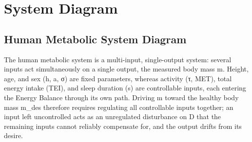 
\section{System Diagram}

\subsection{Human Metabolic System Diagram}

The human metabolic system is a multi-input, single-output system: several inputs act simultaneously on a single output, the measured body mass m. Height, age, and sex (h, a, σ) are fixed parameters, whereas activity (τ, MET), total energy intake (TEI), and sleep duration (s) are controllable inputs, each entering the Energy Balance through its own path. Driving m toward the healthy body mass m_des therefore requires regulating all controllable inputs together; an input left uncontrolled acts as an unregulated disturbance on D that the remaining inputs cannot reliably compensate for, and the output drifts from its desire.

